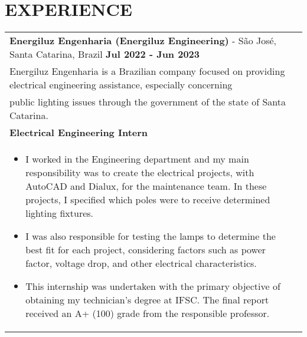 \documentclass[a4paper,8pt]{article}
\begin{document}
\section{\textbf{EXPERIENCE}}
\begin{tabularx}{\linewidth}{ @{}l r@{} }
\textbf{Energiluz Engenharia (Energiluz Engineering)} - São José, Santa Catarina, Brazil \hfill \textbf{Jul 2022 - Jun 2023} \\[4pt]
\item Energiluz Engenharia is a Brazilian company focused on providing electrical engineering assistance, especially concerning \\ public lighting issues through the government of the state of Santa Catarina. \\[4pt]
\textbf{Electrical Engineering Intern} \\[4pt]
\begin{minipage}[t]{\linewidth}
    \begin{itemize}[nosep,after=\strut, leftmargin=1em, itemsep=2pt]
        \item I worked in the Engineering department and my main responsibility was to create the electrical projects, with AutoCAD and Dialux, for the maintenance team. In these projects, I specified which poles were to receive determined lighting fixtures. 
        \item I was also responsible for testing the lamps to determine the best fit for each project, considering factors such as power factor, voltage drop, and other electrical characteristics.
        \item This internship was undertaken with the primary objective of obtaining my technician's degree at IFSC. The final report received an A+ (100) grade from the responsible professor.
    \end{itemize}
\end{minipage}
\end{tabularx}
\end{document}
